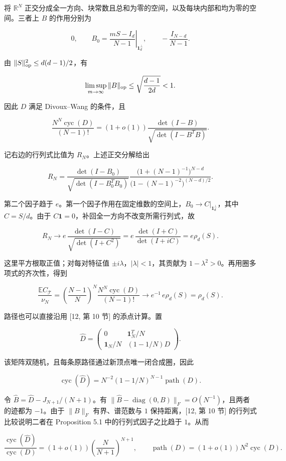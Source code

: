 \documentclass[11pt,a4paper]{article}
\begin{document}
将 \(\mathbb R^N\) 正交分成全一方向、块常数且总和为零的空间，以及每块内部和均为零的空间。三者上 \(B\) 的作用分别为

\[
0,\qquad
B_0=\left.\frac{mS-I_d}{N-1}\right|_{\mathbf1_d^\perp},
\qquad -\frac{I_{N-d}}{N-1}.
\]

由 \(\|S\|_{\rm op}^2\le d(d-1)/2\)，有

\[
\limsup_{m\to\infty}\|B\|_{\rm op}
\le\sqrt{\frac{d-1}{2d}}<1.
\]

因此 \(D\) 满足 Divoux--Wang 的条件，且

\[
\frac{N^N\operatorname{cyc}(D)}{(N-1)!}
=(1+o(1))\frac{\det(I-B)}{\sqrt{\det(I-B^TB)}}.
\]

记右边的行列式比值为 \(R_N\)。上述正交分解给出

\[
R_N=
\frac{\det(I-B_0)}{\sqrt{\det(I-B_0^TB_0)}}
\frac{\bigl(1+(N-1)^{-1}\bigr)^{N-d}}
{\bigl(1-(N-1)^{-2}\bigr)^{(N-d)/2}}.
\]

第二个因子趋于 \(e\)。第一个因子作用在固定维数的空间上，\(B_0\to C|_{\mathbf1_d^\perp}\)，其中 \(C=S/d\)。由于 \(C\mathbf1=0\)，补回全一方向不改变所需行列式，故

\[
R_N\longrightarrow
e\,\frac{\det(I-C)}{\sqrt{\det(I+C^2)}}
=e\,\frac{\det(I+C)}{\det(I+iC)}
=e\rho_d(S).
\]

这里平方根取正值；对每对特征值 \(\pm i\lambda\)，\(|\lambda|<1\)，其贡献为 \(1-\lambda^2>0\)。再用圈多项式的齐次性，得到

\[
\frac{\mathbb EC_{\mathcal T}}{\nu_N}
=\left(\frac{N-1}{N}\right)^N
\frac{N^N\operatorname{cyc}(D)}{(N-1)!}
\longrightarrow e^{-1}\,e\rho_d(S)=\rho_d(S).
\]

路径也可以直接沿用 {[}12, 第 10 节{]} 的添点计算。置

\[
\widehat D=
\begin{pmatrix}
0&\mathbf1_N^T/N\\
\mathbf1_N/N&(1-1/N)D
\end{pmatrix}.
\]

该矩阵双随机，且每条原路径通过新顶点唯一闭合成圈，因此

\[
\operatorname{cyc}(\widehat D)
=N^{-2}(1-1/N)^{N-1}\operatorname{path}(D).
\]

令 \(\widehat B=\widehat D-J_{N+1}/(N+1)\)。有 \(\|\widehat B-\operatorname{diag}(0,B)\|_F=O(N^{-1})\)，且两者的迹都为 \(-1\)。由于 \(\|B\|_F\) 有界、谱范数与 \(1\) 保持距离，{[}12, 第 10 节{]} 的行列式比较说明二者在 Proposition 5.1 中的行列式因子之比趋于 \(1\)。从而

\[
\frac{\operatorname{cyc}(\widehat D)}{\operatorname{cyc}(D)}
=(1+o(1))\left(\frac{N}{N+1}\right)^{N+1},
\qquad
\operatorname{path}(D)=(1+o(1))N^2\operatorname{cyc}(D).
\]
\end{document}
